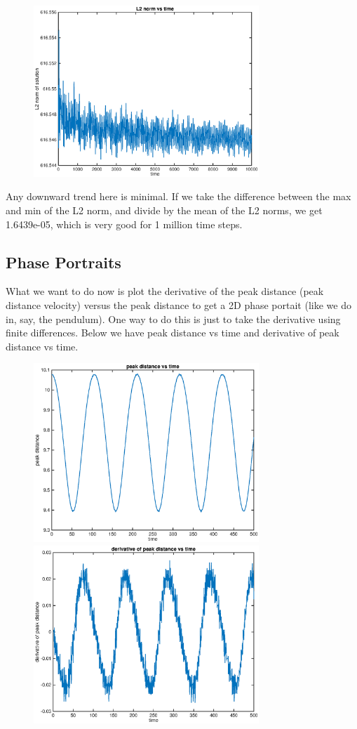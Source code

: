 \documentclass[12pt]{article}
\begin{document}
\begin{figure}[H]
	\includegraphics[width=8.5cm]{L2normvstime.eps}
\end{figure}
Any downward trend here is minimal. If we take the difference between the max and min of the L2 norm, and divide by the mean of the L2 norms, we get 1.6439e-05, which is very good for 1 million time steps.

\subsection*{Phase Portraits}

What we want to do now is plot the derivative of the peak distance (peak distance velocity) versus the peak distance to get a 2D phase portait (like we do in, say, the pendulum). One way to do this is just to take the derivative using finite differences. Below we have peak distance vs time and derivative of peak distance vs time.
\begin{figure}[H]
	\includegraphics[width=8.5cm]{peakdistvstime}
	\includegraphics[width=8.5cm]{peakderivvstime}
\end{figure}
\end{document}
